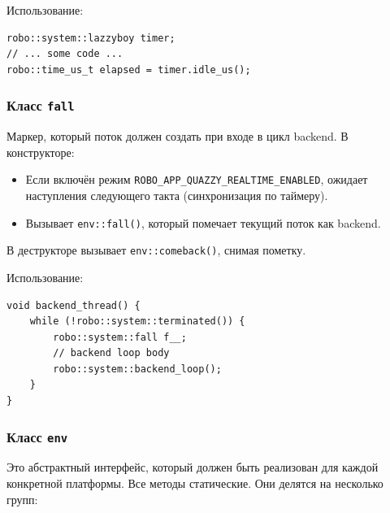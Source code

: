 \documentclass[a4paper,12pt]{article}
\begin{document}
Использование:
\begin{lstlisting}
robo::system::lazzyboy timer;
// ... some code ...
robo::time_us_t elapsed = timer.idle_us();
\end{lstlisting}

\subsubsection{Класс \texttt{fall}}

Маркер, который поток должен создать при входе в цикл backend. В конструкторе:
\begin{itemize}
    \item Если включён режим \texttt{ROBO\_APP\_QUAZZY\_REALTIME\_ENABLED}, ожидает наступления следующего такта (синхронизация по таймеру).
    \item Вызывает \texttt{env::fall()}, который помечает текущий поток как backend.
\end{itemize}
В деструкторе вызывает \texttt{env::comeback()}, снимая пометку.

Использование:
\begin{lstlisting}
void backend_thread() {
    while (!robo::system::terminated()) {
        robo::system::fall f__;
        // backend loop body
        robo::system::backend_loop();
    }
}
\end{lstlisting}

\subsubsection{Класс \texttt{env}}

Это абстрактный интерфейс, который должен быть реализован для каждой конкретной платформы. Все методы статические. Они делятся на несколько групп:
\end{document}
